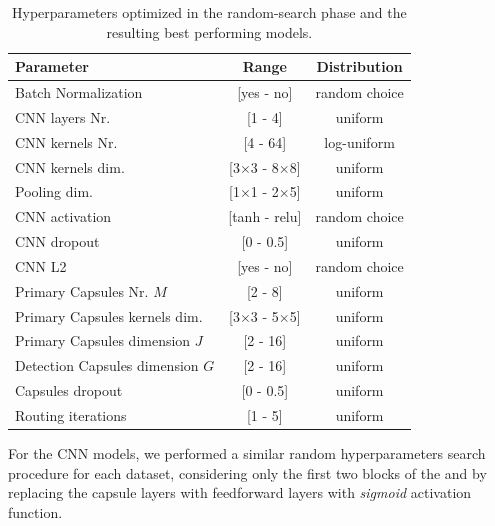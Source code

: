 \begin{table}[!t]
	\centering
	\caption{Hyperparameters optimized in the random-search phase and the resulting best performing models.}		
	\label{tbl:hyper-params-capsule}
	\begin{tabular} { lc c}
		\toprule
		Parameter & Range & Distribution\\  
		\midrule
		Batch Normalization  & [yes - no]	& random choice  \\
		\midrule
		
		CNN layers Nr.  & [1 - 4]& uniform \\
		
		CNN kernels Nr. & [4 - 64]& log-uniform \\
		
		CNN kernels dim. & [3$\times$3 - 8$\times$8]& uniform \\
		
		Pooling dim. & [1$\times$1 - 2$\times$5] & uniform 	\\
		
		CNN activation & [tanh - relu] & random choice \\
		
		CNN dropout  & [0 - 0.5]	& uniform  \\
		
		CNN L2  & [yes - no]	& random choice  \\		
		
		\midrule
		Primary Capsules Nr. $M$ & [2 - 8]	& uniform  \\
		
		Primary Capsules kernels dim. & [3$\times$3 - 5$\times$5]& uniform  \\
		
		Primary Capsules dimension $J$ & [2 - 16]	& uniform \\
		
		Detection Capsules dimension $G$ & [2 - 16]	& uniform \\
		
		Capsules dropout  & [0 - 0.5]	& uniform  \\
		
		Routing iterations  & [1 - 5]	& uniform \\
		
		\bottomrule
	\end{tabular}
\end{table}

For the CNN models, we performed a similar random hyperparameters search procedure for each dataset, considering only the first two blocks of the  and by replacing the capsule layers with feedforward layers with \textit{sigmoid} activation function. 

